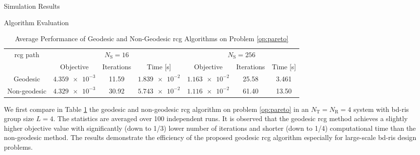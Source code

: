 \begin{section}{Simulation Results}
 \begin{subsection}{Algorithm Evaluation}
	 \begin{table}[!t]
		 \caption{Average Performance of Geodesic and Non-Geodesic \gls{rcg} Algorithms on Problem \eqref{op:pareto}}
		 \label{tb:complexity_test}
		 \centering
		 \begin{tabular}{ccccccc}
			 \toprule
			 \multirow{2}{*}{\gls{rcg} path} & \multicolumn{3}{c}{$N_\mathrm{S}=16$} & \multicolumn{3}{c}{$N_\mathrm{S}=256$}                                                               \\ \cmidrule(lr){2-4} \cmidrule(lr){5-7}
			                                 & Objective                             & Iterations                             & Time [s]         & Objective        & Iterations & Time [s] \\ \midrule
			 Geodesic                        & $\num{4.359e-3}$                      & 11.59                                  & $\num{1.839e-2}$ & $\num{1.163e-2}$ & 25.58      & 3.461    \\
			 Non-geodesic                    & $\num{4.329e-3}$                      & 30.92                                  & $\num{5.743e-2}$ & $\num{1.116e-2}$ & 61.40      & 13.50    \\ \bottomrule
		 \end{tabular}
	 \end{table}
	 We first compare in Table \ref{tb:complexity_test} the geodesic and non-geodesic \gls{rcg} algorithm on problem \eqref{op:pareto} in an $N_\mathrm{T}=N_\mathrm{R}=4$ system with \gls{bd}-\gls{ris} group size $L=4$.
	 The statistics are averaged over \num{100} independent runs.
	 It is observed that the geodesic \gls{rcg} method achieves a slightly higher objective value with significantly (down to 1/3) lower number of iterations and shorter (down to 1/4) computational time than the non-geodesic method.
	 The results demonstrate the efficiency of the proposed geodesic \gls{rcg} algorithm especially for large-scale \gls{bd}-\gls{ris} design problems.
 \end{subsection}


\end{section}
